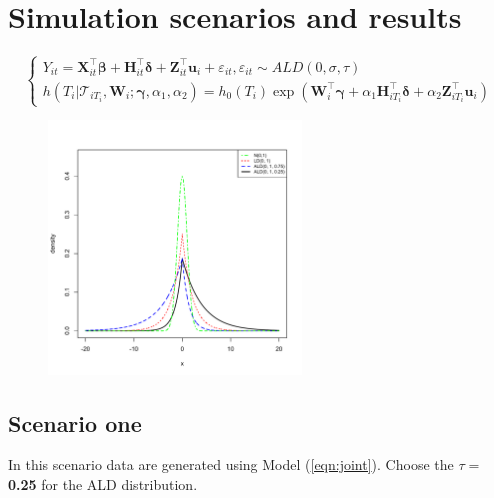 \documentclass{article}
\begin{document}
\section{Simulation scenarios and results}

\begin{equation}\label{eqn:joint}
\left\{
\begin{array}{l}
Y_{it} = {\boldsymbol X}_{it}^{\top}\boldsymbol{\beta} + {\boldsymbol H}_{it}^{\top}\boldsymbol{\delta} + {\boldsymbol Z}_{it}^{\top}{\boldsymbol u}_i + \varepsilon_{it}, \varepsilon_{it}\sim ALD(0, \sigma,\tau)\\
h(T_i|\mathcal{T}_{iT_i}, {\boldsymbol W}_i;  \boldsymbol{\gamma}, \alpha_1,
\alpha_2) = h_0(T_i)\exp({\boldsymbol W}_i^{\top}\boldsymbol{\gamma} + \alpha_1{\boldsymbol H}_{iT_i}^{\top}\boldsymbol{\delta} + \alpha_2{\boldsymbol Z}_{iT_i}^{\top}{\boldsymbol u}_{i})
\end{array}
\right.
\end{equation}

\begin{figure}[H]
\centering
\includegraphics[width=0.6\textwidth]{ald_ld_normal.pdf}
\end{figure}

\subsection{Scenario one}
In this scenario data are generated using Model (\ref{eqn:joint}). Choose the $\tau=$ {\bf 0.25} for the ALD distribution.
\end{document}
